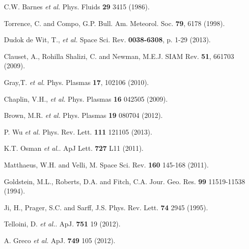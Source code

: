 \documentclass[aps,prl,amsmath,amssymb,reprint,superscriptaddress]{revtex4-1} %
\begin{document}
\begin{thebibliography}{99}
C.W. Barnes {\it et al.} Phys. Fluids {\bf 29} 3415 (1986).

Torrence, C. and Compo, G.P. Bull. Am. Meteorol. Soc. {\bf 79}, 6178 (1998).

Dudok de Wit, T., {\it et al.} Space Sci. Rev. {\bf 0038-6308}, p. 1-29 (2013).

Clauset, A., Rohilla Shalizi, C. and Newman, M.E.J. SIAM Rev. {\bf 51}, 661703 (2009).

Gray,T. {\it et al.} Phys. Plasmas {\bf 17}, 102106 (2010).

Chaplin, V.H., {\it et al.} Phys. Plasmas {\bf 16} 042505 (2009).

Brown, M.R. {\it et al.} Phys. Plasmas {\bf 19} 080704 (2012).

P. Wu {\it et al.} Phys. Rev. Lett. {\bf 111} 121105 (2013).

K.T. Osman {\it et al.}. ApJ Lett. {\bf 727} L11 (2011).

Matthaeus, W.H. and Velli, M. Space Sci. Rev. {\bf 160} 145-168 (2011).

Goldstein, M.L., Roberts, D.A. and Fitch, C.A. Jour. Geo. Res. {\bf 99} 11519-11538 (1994).

Ji, H., Prager, S.C. and Sarff, J.S. Phys. Rev. Lett. {\bf 74} 2945 (1995).

Telloini, D. {\it et al.}. ApJ. {\bf 751} 19 (2012).

A. Greco {\it et al.} ApJ. {\bf 749} 105 (2012).

\end{thebibliography}
\end{document}
